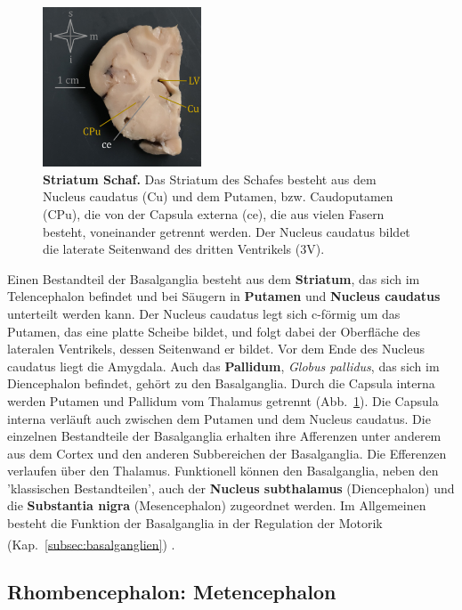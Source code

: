 \documentclass[12pt,a4paper,pdftex]{article}
\begin{document}
\begin{figure}
    \centering
    \includegraphics[width=0.42\textwidth]{pictures/Bilder_Jule/Schaf/Ausschnitte/Striatum.png}
    \caption[Striatum Schaf.]{\textbf{Striatum Schaf.} Das Striatum des Schafes besteht aus dem Nucleus caudatus (Cu) und dem Putamen, bzw. Caudoputamen (CPu), die von der Capsula externa (ce), die aus vielen Fasern besteht, voneinander getrennt werden. Der Nucleus caudatus bildet die laterate Seitenwand des dritten Ventrikels (3V).}
    \label{fig:striatum}
\end{figure}

\noindent Einen Bestandteil der Basalganglia besteht aus dem \textbf{Striatum}, das sich im Telencephalon befindet und bei Säugern in \textbf{Putamen} und \textbf{Nucleus caudatus}  unterteilt werden kann. Der Nucleus caudatus legt sich c-förmig um das Putamen, das eine platte Scheibe bildet, und folgt dabei der Oberfläche des lateralen Ventrikels, dessen Seitenwand er bildet. Vor dem Ende des Nucleus caudatus liegt die Amygdala. Auch das \textbf{Pallidum}, \textit{Globus pallidus}, das sich im Diencephalon befindet, gehört zu den Basalganglia. Durch die Capsula interna werden Putamen und Pallidum vom Thalamus getrennt (Abb.~\ref{fig:striatum}). Die Capsula interna verläuft auch zwischen dem Putamen und dem Nucleus caudatus. Die einzelnen Bestandteile der Basalganglia erhalten ihre Afferenzen unter anderem aus dem Cortex und den anderen Subbereichen der Basalganglia. Die Efferenzen verlaufen über den Thalamus. Funktionell können den Basalganglia, neben den 'klassischen Bestandteilen', auch der \textbf{Nucleus subthalamus} (Diencephalon) und die \textbf{Substantia nigra} (Mesencephalon) zugeordnet werden.
Im Allgemeinen besteht die Funktion der Basalganglia in der Regulation der Motorik (Kap.~\ref{subsec:basalganglien}) \textsuperscript{\cite[9]{trepel2011neuroanatomie}}.


\subsection{Rhombencephalon: Metencephalon}
\label{subsec:Metencephalon} 
\end{document}
